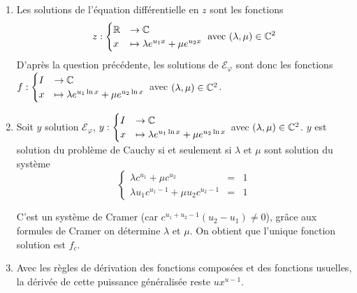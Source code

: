 \begin{enumerate}
\begin{enumerate}
\item Les solutions de l'équation différentielle en $z$ sont les fonctions
\begin{displaymath}
z : \begin{cases}\mathbb{R} &\rightarrow \mathbb{C} \\ x &\mapsto \lambda e^{u_1 x}+\mu e^{u_2 x} \end{cases}\text{ avec }(\lambda,\mu)\in\mathbb{C}^2  
\end{displaymath}
D'après la question précédente, les solutions de $\mathcal E_\varphi$ sont donc les fonctions 
$f : \begin{cases}I &\rightarrow \mathbb{C} \\ x &\mapsto \lambda e^{u_1 \ln x}+\mu e^{u_2 \ln x} \end{cases}$ avec $(\lambda,\mu)\in\mathbb{C}^2$.
\item Soit $y$ solution $\mathcal E_\varphi$,  $y : \begin{cases}I &\rightarrow \mathbb{C} \\ x &\mapsto \lambda e^{u_1 \ln x}+\mu e^{u_2 \ln x} \end{cases}$ avec $(\lambda,\mu)\in\mathbb{C}^2$. $y$ est solution du problème de Cauchy si et seulement si $\lambda$ et $\mu$ sont solution du système 
$$\left\{\begin{array}{lll}
\lambda c^{u_1}+\mu c^{u_2}&=&1\\
\lambda u_1c^{u_1-1}+\mu u_2c^{u_2-1}&=&1
\end{array}\right.$$

C'est un système de Cramer (car $c^{u_1+u_2-1}(u_2-u_1)\neq 0$), grâce aux formules de Cramer on détermine $\lambda$ et $\mu$. On obtient que l'unique fonction solution est $f_c$.

\item Avec les règles de dérivation des fonctions composées et des fonctions usuelles, la dérivée de cette puissance généralisée reste $ux^{u-1}$.


\end{enumerate}
\end{enumerate}
